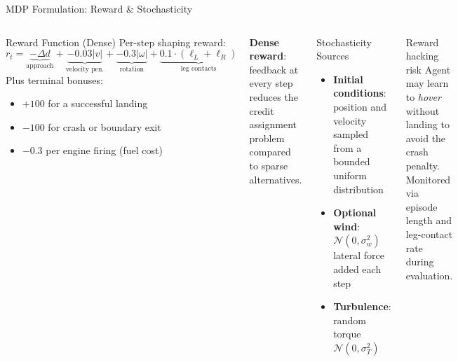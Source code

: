 \documentclass[aspectratio=169, 10pt]{beamer}
\begin{document}
\begin{frame}{MDP Formulation: Reward \& Stochasticity}
  \begin{columns}[T]
      \begin{block}{Reward Function (Dense)}
        Per-step shaping reward:
        \[
          r_t = \underbrace{-\Delta d}_{\text{approach}} +
                \underbrace{-0.03|v|}_{\text{velocity pen.}} +
                \underbrace{-0.3|\omega|}_{\text{rotation}} +
                \underbrace{0.1 \cdot (\ell_L + \ell_R)}_{\text{leg contacts}}
        \]
        Plus terminal bonuses:
        \begin{itemize}
          \item $+100$ for a successful landing
          \item $-100$ for crash or boundary exit
          \item $-0.3$ per engine firing (fuel cost)
        \end{itemize}
      \end{block}
      \textbf{Dense reward}: feedback at every step reduces the credit
      assignment problem compared to sparse alternatives.
      \begin{block}{Stochasticity Sources}
        \begin{itemize}
          \item \textbf{Initial conditions}: position and velocity
                sampled from a bounded uniform distribution
          \item \textbf{Optional wind}: $\mathcal{N}(0, \sigma_w^2)$
                lateral force added each step
          \item \textbf{Turbulence}: random torque
                $\mathcal{N}(0, \sigma_T^2)$
        \end{itemize}
      \end{block}
      \vspace{0.4em}
      \begin{alertblock}{Reward hacking risk}
        Agent may learn to \emph{hover} without landing to avoid the
        crash penalty. Monitored via episode length and leg-contact
        rate during evaluation.
      \end{alertblock}
  \end{columns}
\end{frame}
\end{document}
